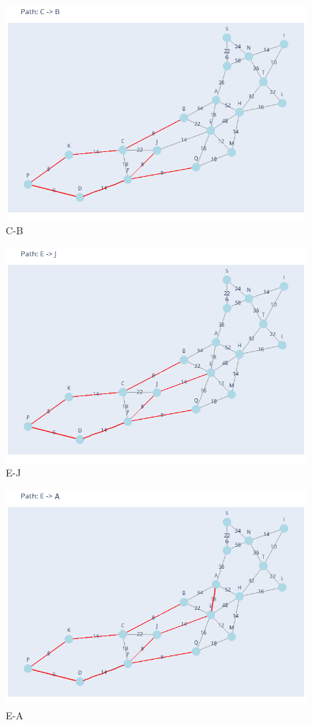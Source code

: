 \documentclass[11pt]{book}
\renewcommand{\=}[1]{\stackrel{#1}{=}} %
\theoremstyle{definition}
\theoremstyle{remark}
\begin{document}
\begin{figure}
    \centering
    \includegraphics[width=0.7\linewidth]{MSTpath/7.png}
    \caption{C-B}
    \label{fig:enter-label}
\end{figure}
\begin{figure}
    \centering
    \includegraphics[width=0.7\linewidth]{MSTpath/8.png}
    \caption{E-J}
    \label{fig:enter-label}
\end{figure}
\begin{figure}
    \centering
    \includegraphics[width=0.7\linewidth]{MSTpath/9.png}
    \caption{E-A}
    \label{fig:enter-label}
\end{figure}
\end{document}
